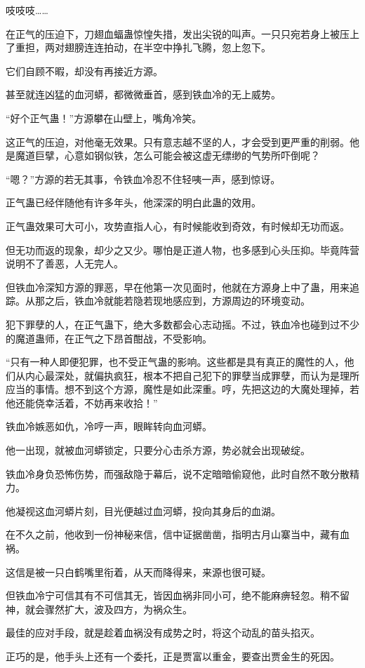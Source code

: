 \begin{this_body}
吱吱吱……

在正气的压迫下，刀翅血蝠蛊惊惶失措，发出尖锐的叫声。一只只宛若身上被压上了重担，两对翅膀连连拍动，在半空中挣扎飞腾，忽上忽下。

它们自顾不暇，却没有再接近方源。

甚至就连凶猛的血河蟒，都微微垂首，感到铁血冷的无上威势。

“好个正气蛊！”方源攀在山壁上，嘴角冷笑。

这正气的压迫，对他毫无效果。只有意志越不坚的人，才会受到更严重的削弱。他是魔道巨擘，心意如钢似铁，怎么可能会被这虚无缥缈的气势所吓倒呢？

“嗯？”方源的若无其事，令铁血冷忍不住轻咦一声，感到惊讶。

正气蛊已经伴随他有许多年头，他深深的明白此蛊的效用。

正气蛊效果可大可小，攻势直指人心，有时候能收到奇效，有时候却无功而返。

但无功而返的现象，却少之又少。哪怕是正道人物，也多感到心头压抑。毕竟阵营说明不了善恶，人无完人。

但铁血冷深知方源的罪恶，早在他第一次见面时，他就在方源身上中了蛊，用来追踪。从那之后，铁血冷就能若隐若现地感应到，方源周边的环境变动。

犯下罪孽的人，在正气蛊下，绝大多数都会心志动摇。不过，铁血冷也碰到过不少的魔道蛊师，在正气之下昂首酣战，不受影响。

“只有一种人即便犯罪，也不受正气蛊的影响。这些都是具有真正的魔性的人，他们从内心最深处，就偏执疯狂，根本不把自己犯下的罪孽当成罪孽，而认为是理所应当的事情。想不到这个方源，魔性是如此深重。哼，先把这边的大魔处理掉，若他还能侥幸活着，不妨再来收拾！”

铁血冷嫉恶如仇，冷哼一声，眼眸转向血河蟒。

他一出现，就被血河蟒锁定，只要分心击杀方源，势必就会出现破绽。

铁血冷身负恐怖伤势，而强敌隐于幕后，说不定暗暗偷窥他，此时自然不敢分散精力。

他凝视这血河蟒片刻，目光便越过血河蟒，投向其身后的血湖。

在不久之前，他收到一份神秘来信，信中证据凿凿，指明古月山寨当中，藏有血祸。

这信是被一只白鹤嘴里衔着，从天而降得来，来源也很可疑。

但铁血冷宁可信其有不可信其无，皆因血祸非同小可，绝不能麻痹轻忽。稍不留神，就会骤然扩大，波及四方，为祸众生。

最佳的应对手段，就是趁着血祸没有成势之时，将这个动乱的苗头掐灭。

正巧的是，他手头上还有一个委托，正是贾富以重金，要查出贾金生的死因。


\end{this_body}
